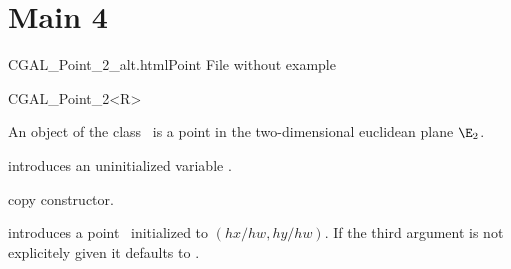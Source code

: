 
\chapter{Main 4}

\begin{ccHtmlClassFile}{CGAL_Point_2_alt.html}{Point File without example}

\ccHtmlNoClassLinks
\ccHtmlNoClassIndex
\ccHtmlNoClassFile  %



\begin{ccClassTemplate} {CGAL_Point_2<R>}



\ccDefinition
An object of the class \ccClassName\ is a point in the two-dimensional
euclidean plane $\E_2$. 


\ccCreation
{}


\ccHidden {}
             {introduces an uninitialized variable \ccVar.}

\ccHidden {}
            {copy constructor.}

            {introduces a point \ccVar\ initialized to $(hx/hw,hy/hw)$.
             If the third argument is not explicitely given it defaults
             to .}

\end{ccClassTemplate} 

\end{ccHtmlClassFile}



